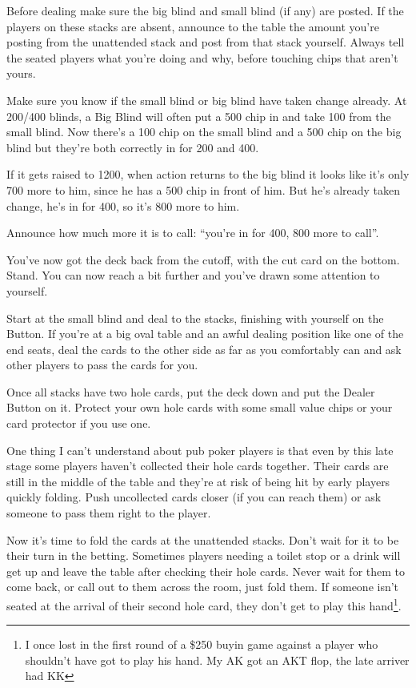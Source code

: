 Before dealing make sure the big blind and small blind (if any) are
posted. If the players on these stacks are absent, announce to the table
the amount you're posting from the unattended stack and post from
that stack yourself. Always tell the seated players what you're doing and why,
before touching chips that aren't yours.

Make sure you know if the small blind or big blind have taken change
already. At 200/400 blinds, a Big Blind will often put a 500 chip in
and take 100 from the small blind. Now there's a 100 chip on the
small blind and a 500 chip on the big blind but they're both correctly
in for 200 and 400.

If it gets raised to 1200, when action returns to the big blind it
looks like it's only 700 more to him, since he has a 500 chip in front
of him. But he's already taken change, he's in for 400, so it's 800 more
to him.

Announce how much more it is to call: ``you're in for 400,
800 more to call''.

You've now got the deck back from the cutoff, with the cut card on
the bottom. Stand. You can now reach a bit further
and you've drawn some attention to yourself.

Start at the small blind and deal to the stacks, finishing with yourself
on the Button. If you're at a big oval table and an awful dealing position like
one of the end seats, deal the cards to the other side as far as you comfortably
can and ask other players to pass the cards for you.

Once all stacks have two hole cards, put the deck down and put the Dealer
Button on it. Protect your own hole cards with some small value chips or
your card protector if you use one.

One thing I can't understand about pub poker players is that even by
this late stage some players haven't collected their hole cards together.
Their cards are still in the middle of the table and they're at risk
of being hit by early players quickly folding.  Push uncollected
cards closer (if you can reach them) or ask someone to
pass them right to the player.

Now it's time to fold the cards at the unattended stacks. Don't wait for
it to be their turn in the betting. Sometimes players needing a toilet
stop or a drink will get up and leave the table after checking their hole
cards. Never wait for them to come back, or call out to them across the
room, just fold them. If someone isn't seated at the arrival of their
second hole card, they don't get to play this hand\footnote{I once
lost in the first round of a \$250 buyin game against a player who
shouldn't have got to play his hand. My AK got an AKT flop, the late
arriver had KK}.

